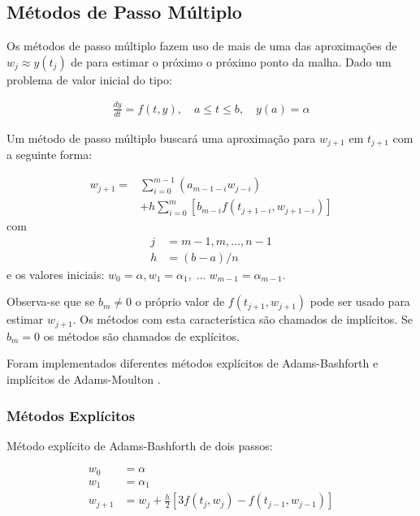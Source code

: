 \documentclass[final,5p]{elsarticle}
\numberwithin{equation}{section}
\begin{document}
    \subsection{Métodos de Passo Múltiplo}

        Os métodos de passo múltiplo fazem uso de mais de uma das aproximações de $w_j \approx y(t_j)$ de para estimar o próximo o próximo ponto da malha. Dado um problema de valor inicial do tipo:

        \begin{align}
            \frac{dy}{dt} = f(t,y), \quad a \leq t \leq b, \quad y(a) = \alpha \label{eq:pvi}
        \end{align}

        Um método de passo múltiplo buscará uma aproximação para $w_{j+1}$ em $t_{j+1}$ com a seguinte forma:

        \begin{align}
            w_{j+1} =& \sum_{i=0}^{m-1} \left( a_{m-1-i} w_{j-i} \right) \nonumber \\
            &+ h \sum_{i=0}^{m} \left[ b_{m-i} f(t_{j+1-i},w_{j+1-i}) \right] \label{eq:passomultiplo}
        \end{align}
        com
        \begin{align}
            j&=m-1,m,\ldots,n-1 \nonumber \\
            h&=(b-a)/n \nonumber
        \end{align}
        e os valores iniciais: $w_0=\alpha, w_1=\alpha_1, \; \ldots \; w_{m-1}=\alpha_{m-1}$.

        Observa-se que se $b_m \neq 0$ o próprio valor de $f(t_{j+1},w_{j+1})$ pode ser usado para estimar $w_{j+1}$. Os métodos com esta característica são chamados de implícitos. Se $b_m = 0$ os métodos são chamados de explícitos.

        Foram implementados diferentes métodos explícitos de Adams-Bashforth e implícitos de Adams-Moulton \cite{burden2016analise}.

    \subsubsection{Métodos Explícitos}

        Método explícito de Adams-Bashforth de dois passos:

        \begin{align}
            w_0 &= \alpha \nonumber \\
            w_1 &= \alpha_1 \nonumber \\
            w_{j+1} &= w_j + \frac{h}{2} \left[ 3 f(t_j, w_j) - f(t_{j-1}, w_{j-1}) \right] \label{eq:adamsbashforth2}
        \end{align}
\end{document}

